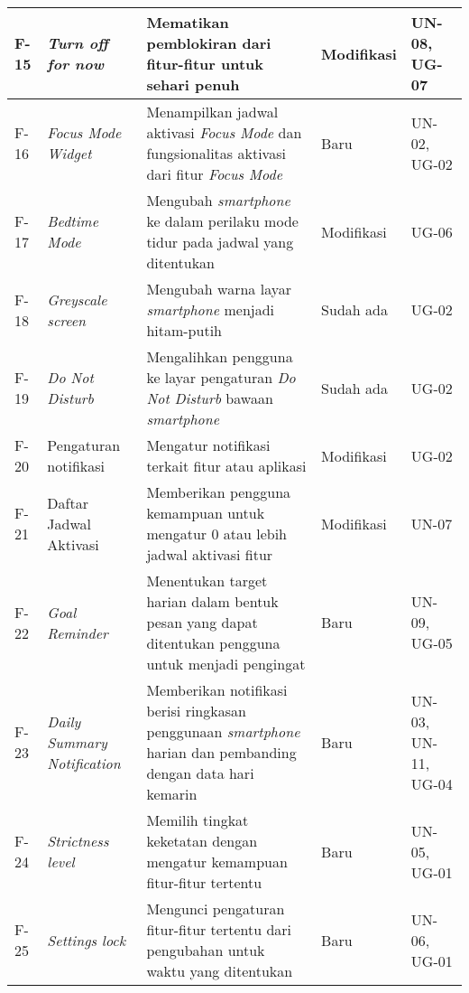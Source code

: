 \begin{small}
\begin{longtable}[c]{|W{c}{0.06\textwidth}|>{\cccnormspacingcenter}m{0.15\textwidth}|>{\cccnormspacing}m{0.35\textwidth}|>{\cccnormspacingcenter}m{0.12\textwidth}|>{\cccnormspacingcenter}m{0.16\textwidth}|}
  F-15 & \textit{Turn off for now} & Mematikan pemblokiran dari fitur-fitur untuk sehari penuh & Modifikasi & UN-08, UG-07 \\ \hline
  F-16 & \textit{Focus Mode Widget} & Menampilkan jadwal aktivasi \textit{Focus Mode} dan fungsionalitas aktivasi dari fitur \textit{Focus Mode} & Baru & UN-02, UG-02 \\ \hline
  F-17 & \textit{Bedtime Mode} & Mengubah \textit{smartphone} ke dalam perilaku mode tidur pada jadwal yang ditentukan & Modifikasi & UG-06 \\ \hline
  F-18 & \textit{Greyscale screen} & Mengubah warna layar \textit{smartphone} menjadi hitam-putih & Sudah ada & UG-02 \\ \hline
  F-19 & \textit{Do Not Disturb} & Mengalihkan pengguna ke layar pengaturan \textit{Do Not Disturb} bawaan \textit{smartphone} & Sudah ada & UG-02 \\ \hline
  F-20 & Pengaturan notifikasi & Mengatur notifikasi terkait fitur atau aplikasi & Modifikasi & UG-02 \\ \hline
  F-21 & Daftar Jadwal Aktivasi & Memberikan pengguna kemampuan untuk mengatur 0 atau lebih jadwal aktivasi fitur & Modifikasi & UN-07 \\ \hline
  F-22 & \textit{Goal Reminder} & Menentukan target harian dalam bentuk pesan yang dapat ditentukan pengguna untuk menjadi pengingat & Baru & UN-09, UG-05 \\ \hline
  F-23 & \textit{Daily Summary Notification} & Memberikan notifikasi berisi ringkasan penggunaan \textit{smartphone} harian dan pembanding dengan data hari kemarin & Baru & UN-03, UN-11, UG-04 \\ \hline
  F-24 & \textit{Strictness level} & Memilih tingkat keketatan dengan mengatur kemampuan fitur-fitur tertentu & Baru & UN-05, UG-01 \\ \hline
  F-25 & \textit{Settings lock} & Mengunci pengaturan fitur-fitur tertentu dari pengubahan untuk waktu yang ditentukan & Baru & UN-06, UG-01 \\ \hline

\end{longtable}
\end{small}
\justifying
\FloatBarrier

